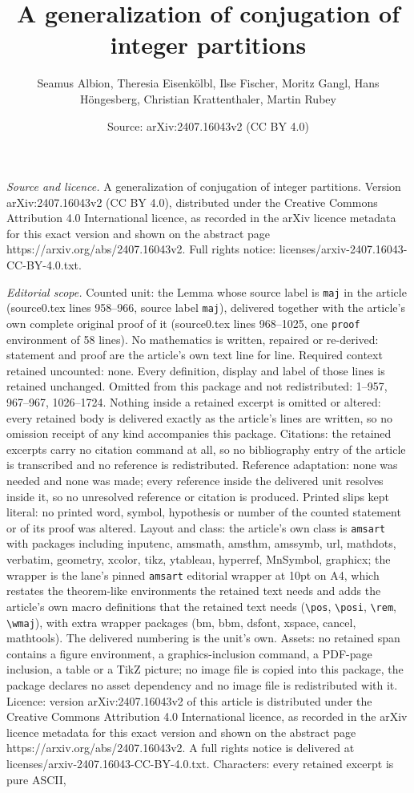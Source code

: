 \documentclass[10pt,a4paper]{amsart}
\title[A generalization of conjugation of integer partitions]{A generalization of conjugation of integer partitions}
\author{Seamus Albion, Theresia Eisenk\"olbl, Ilse Fischer, Moritz Gangl, Hans H\"ongesberg, Christian Krattenthaler, Martin Rubey}
\date{Source: arXiv:2407.16043v2 (CC BY 4.0)}
\begin{document}
\maketitle

\noindent\emph{Source and licence.} A generalization of conjugation of integer partitions. Version arXiv:2407.16043v2 (CC BY 4.0), distributed under the Creative Commons Attribution 4.0 International licence, as recorded in the arXiv licence metadata for this exact version and shown on the abstract page https://arxiv.org/abs/2407.16043v2. Full rights notice: licenses/arxiv-2407.16043-CC-BY-4.0.txt.\par\smallskip

\noindent\textit{Editorial scope.} Counted unit: the Lemma whose source label is \texttt{maj} in the article (source0.tex lines 958--966, source label \texttt{maj}), delivered together with the article's own complete original proof of it (source0.tex lines 968--1025, one \texttt{proof} environment of 58 lines). No mathematics is written, repaired or re-derived: statement and proof are the article's own text line for line. Required context retained uncounted: none. Every definition, display and label of those lines is retained unchanged. Omitted from this package and not redistributed: 1--957, 967--967, 1026--1724. Nothing inside a retained excerpt is omitted or altered: every retained body is delivered exactly as the article's lines are written, so no omission receipt of any kind accompanies this package. Citations: the retained excerpts carry no citation command at all, so no bibliography entry of the article is transcribed and no reference is redistributed. Reference adaptation: none was needed and none was made; every reference inside the delivered unit resolves inside it, so no unresolved reference or citation is produced. Printed slips kept literal: no printed word, symbol, hypothesis or number of the counted statement or of its proof was altered. Layout and class: the article's own class is \texttt{amsart} with packages including inputenc, amsmath, amsthm, amssymb, url, mathdots, verbatim, geometry, xcolor, tikz, ytableau, hyperref, MnSymbol, graphicx; the wrapper is the lane's pinned \texttt{amsart} editorial wrapper at 10pt on A4, which restates the theorem-like environments the retained text needs and adds the article's own macro definitions that the retained text needs (\texttt{\textbackslash pos}, \texttt{\textbackslash posi}, \texttt{\textbackslash rem}, \texttt{\textbackslash wmaj}), with extra wrapper packages (bm, bbm, dsfont, xspace, cancel, mathtools). The delivered numbering is the unit's own. Assets: no retained span contains a figure environment, a graphics-inclusion command, a PDF-page inclusion, a table or a TikZ picture; no image file is copied into this package, the package declares no asset dependency and no image file is redistributed with it. Licence: version arXiv:2407.16043v2 of this article is distributed under the Creative Commons Attribution 4.0 International licence, as recorded in the arXiv licence metadata for this exact version and shown on the abstract page https://arxiv.org/abs/2407.16043v2. A full rights notice is delivered at licenses/arxiv-2407.16043-CC-BY-4.0.txt. Characters: every retained excerpt is pure ASCII, 
\end{document}

